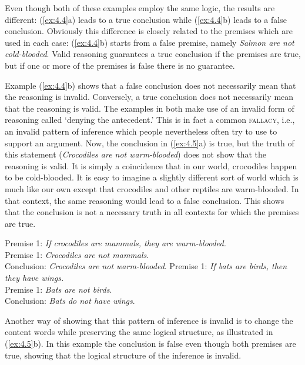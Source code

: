 Even though both of these examples employ the same logic, the results are different: (\ref{ex:4.4}a) leads to a true conclusion while (\ref{ex:4.4}b) leads to a false conclusion. Obviously this difference is closely related to the premises which are used in each case: (\ref{ex:4.4}b) starts from a false premise, namely \textit{Salmon are not cold-blooded}. Valid reasoning guarantees a true conclusion if the premises are true, but if one or more of the premises is false there is no guarantee.



Example (\ref{ex:4.4}b) shows that a false conclusion does not necessarily mean that the reasoning is invalid. Conversely, a true conclusion does not necessarily mean that the reasoning is valid. The examples in  both make use of an invalid form of reasoning called ‘denying the antecedent.’ This is in fact a common \textsc{fallacy}, i.e., an invalid pattern of inference which people nevertheless often try to use to support an argument. Now, the conclusion in (\ref{ex:4.5}a) is true, but the truth of this statement (\textit{Crocodiles are not warm-blooded}) does not show that the reasoning is valid. It is simply a coincidence that in our world, crocodiles happen to be cold-blooded. It is easy to imagine a slightly different sort of world which is much like our own except that crocodiles and other reptiles are warm-blooded. In that context, the same reasoning would lead to a false conclusion. This shows that the conclusion is not a necessary truth in all contexts for which the premises are true.


\ea \label{ex:4.5}
\ea  Premise 1: \textit{If crocodiles are mammals, they are warm-blooded.\\
}Premise 1: \textit{Crocodiles are not mammals}.\\
\FelixHRule
Conclusion: \textit{Crocodiles are not warm-blooded}.
\ex  Premise 1: \textit{If bats are birds, then they have wings.}\\
Premise 1: \textit{Bats are not birds}.\\
\FelixHRule
Conclusion: \textit{Bats do not have wings}.
\z \z


Another way of showing that this pattern of inference is invalid is to change the content words while preserving the same logical structure, as illustrated in (\ref{ex:4.5}b). In this example the conclusion is false even though both premises are true, showing that the logical structure of the inference is invalid.



